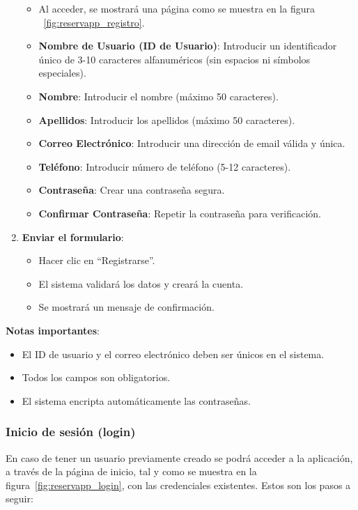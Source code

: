 \begin{enumerate}
\begin{itemize}
      \item Al acceder, se mostrará una página como se muestra en la figura ~\ref{fig:reservapp_registro}.
      \item \textbf{Nombre de Usuario (ID de Usuario)}: Introducir un identificador único de 3-10 caracteres alfanuméricos (sin espacios ni símbolos especiales).
      \item \textbf{Nombre}: Introducir el nombre (máximo 50 caracteres).
      \item \textbf{Apellidos}: Introducir los apellidos (máximo 50 caracteres).
      \item \textbf{Correo Electrónico}: Introducir una dirección de email válida y única.
      \item \textbf{Teléfono}: Introducir número de teléfono (5-12 caracteres).
      \item \textbf{Contraseña}: Crear una contraseña segura.
      \item \textbf{Confirmar Contraseña}: Repetir la contraseña para verificación.
   \end{itemize}
   \item \textbf{Enviar el formulario}:
   \begin{itemize}
      \item Hacer clic en ``Registrarse''.
      \item El sistema validará los datos y creará la cuenta.
      \item Se mostrará un mensaje de confirmación.
   \end{itemize}
\end{enumerate}

\textbf{Notas importantes}:
\begin{itemize}
   \item El ID de usuario y el correo electrónico deben ser únicos en el sistema.
   \item Todos los campos son obligatorios.
   \item El sistema encripta automáticamente las contraseñas.
\end{itemize}

\subsubsection{Inicio de sesión (login)}
En caso de tener un usuario previamente creado se podrá acceder a la aplicación, a través de la página de inicio, tal y como se muestra en la figura~\ref{fig:reservapp_login}, con las credenciales existentes. Estos son los pasos a seguir:

